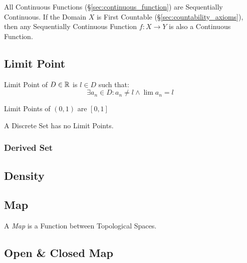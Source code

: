 All Continuous Functions (\S\ref{sec:continuous_function}) are
Sequentially Continuous. If the Domain $X$ is First Countable
(\S\ref{sec:countability_axioms}), then any Sequentially Continuous
Function $f : X \rightarrow Y$ is also a Continuous Function.



\subsection{Limit Point}\label{sec:limit_point}

Limit Point of $D \in \mathbb{R}$ is $l \in D$ such that:
\[
  \exists a_n \in D : a_n \neq l \wedge \lim a_n = l
\]

Limit Points of $(0,1)$ are $[0,1]$

A Discrete Set has no Limit Points. %



\subsubsection{Derived Set}\label{sec:derived_set}



\subsection{Density}\label{sec:density}

\subsection{Map}\label{sec:topology_map}

A \emph{Map} is a Function between Topological Spaces.



\subsection{Open \& Closed Map}\label{sec:open_closed_map}

